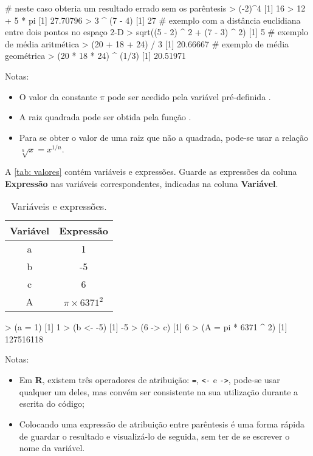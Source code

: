 \documentclass{exam}
\begin{document}
\begin{questions}
\begin{itemize}
\end{itemize}

\begin{solution}
	\begin{rcode}
		# neste caso obteria um resultado errado sem os parêntesis
		> (-2)^4
		[1] 16
		> 12 + 5 * pi
		[1] 27.70796
		> 3 ^ (7 - 4)
		[1] 27
		# exemplo com a distância euclidiana entre dois pontos no espaço 2-D 
		> sqrt((5 - 2) ^ 2 + (7 - 3) ^ 2)
		[1] 5
		# exemplo de média aritmética
		> (20 + 18 + 24) / 3
		[1] 20.66667
		# exemplo de média geométrica
		> (20 * 18 * 24) ^ (1/3)
		[1] 20.51971
	\end{rcode}
	Notas:
	\begin{itemize}
		\item O valor da constante $\pi$ pode ser acedido pela variável pré-definida .
		\item A raiz quadrada pode ser obtida pela função .
		\item Para se obter o valor de uma raiz que não a quadrada, pode-se usar a relação $\sqrt[n]{x} = x^{1/n}$.
	\end{itemize}
\end{solution}

\question A \autoref{tab: valores} contém variáveis e expressões. Guarde as expressões da coluna \textbf{Expressão} nas variáveis correspondentes, indicadas na coluna \textbf{Variável}.

\begin{table}[htp]
	\caption{Variáveis e expressões.}
	\label{tab: valores}
	\begin{center}
		\begin{tabular}{cc}
			Variável & Expressão \\ \hline
			a & 1 \\
			b & -5 \\
			c & 6 \\
			A & $\pi \times 6371^2$ \\
			\hline
		\end{tabular}
	\end{center}
\end{table}

\begin{solution}
	\begin{rcode}
		> (a = 1)
		[1] 1
		> (b <- -5)
		[1] -5
		> (6 -> c)
		[1] 6
		> (A = pi * 6371 ^ 2)
		[1] 127516118
	\end{rcode}
Notas:
\begin{itemize}
\item Em \textbf{R}, existem três operadores de atribuição: \texttt{=}, \texttt{<-} e \texttt{->}, pode-se usar qualquer um deles, mas convém ser consistente na sua utilização durante a escrita do código;
\item Colocando uma expressão de atribuição entre parêntesis é uma forma rápida de guardar o resultado e visualizá-lo de seguida, sem ter de se escrever o nome da variável.
\end{itemize}
\end{solution}


\end{questions}
\end{document}
